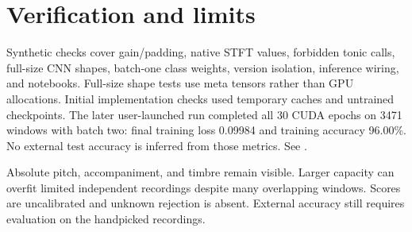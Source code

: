\documentclass[11pt,a4paper]{article}
\begin{document}
\section{Verification and limits}
Synthetic checks cover gain/padding, native STFT values, forbidden tonic calls,
full-size CNN shapes, batch-one class weights, version isolation, inference wiring,
and notebooks. Full-size shape tests use meta tensors rather than GPU allocations.
Initial implementation checks used temporary caches and untrained checkpoints.
The later user-launched run completed all 30 CUDA epochs on 3471 windows with
batch two: final training loss 0.09984 and training accuracy 96.00\%. No external
test accuracy is inferred from those metrics. See .

Absolute pitch, accompaniment, and timbre remain visible. Larger capacity can
overfit limited independent recordings despite many overlapping windows. Scores
are uncalibrated and unknown rejection is absent. External accuracy still requires
evaluation on the handpicked recordings.
\end{document}
